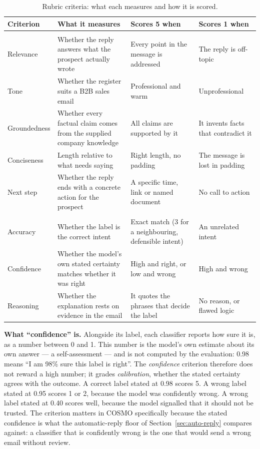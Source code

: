 \documentclass[a4paper]{article}
\begin{document}
\begin{table}[H]
\centering
\caption{Rubric criteria: what each measures and how it is scored.}
\label{tab:metric-defs}
\small
\begin{tabularx}{\textwidth}{>{\raggedright\arraybackslash}p{2.1cm} >{\raggedright\arraybackslash}X >{\raggedright\arraybackslash}X >{\raggedright\arraybackslash}X}
\toprule
\textbf{Criterion} & \textbf{What it measures} & \textbf{Scores 5 when} & \textbf{Scores 1 when} \\
\midrule
\multicolumn{4}{l}{\emph{Task 1 --- reply generation}} \\
Relevance & Whether the reply answers what the prospect actually wrote & Every point in the message is addressed & The reply is off-topic \\
Tone & Whether the register suits a B2B sales email & Professional and warm & Unprofessional \\
Groundedness & Whether every factual claim comes from the supplied company knowledge & All claims are supported by it & It invents facts that contradict it \\
Conciseness & Length relative to what needs saying & Right length, no padding & The message is lost in padding \\
Next step & Whether the reply ends with a concrete action for the prospect & A specific time, link or named document & No call to action \\
\midrule
\multicolumn{4}{l}{\emph{Task 2 --- intent classification}} \\
Accuracy & Whether the label is the correct intent & Exact match (3 for a neighbouring, defensible intent) & An unrelated intent \\
Confidence & Whether the model's own stated certainty matches whether it was right & High and right, or low and wrong & High and wrong \\
Reasoning & Whether the explanation rests on evidence in the email & It quotes the phrases that decide the label & No reason, or flawed logic \\
\bottomrule
\end{tabularx}
\end{table}

\textbf{What ``confidence'' is.} Alongside its label, each classifier reports
how sure it is, as a number between 0 and 1. This number is the model's own
estimate about its own answer --- a self-assessment --- and is not computed by
the evaluation: 0.98 means ``I am 98\% sure this label is right''. The
\emph{confidence} criterion therefore does not reward a high number; it grades
\emph{calibration}, whether the stated certainty agrees with the outcome. A
correct label stated at 0.98 scores 5. A wrong label stated at 0.95 scores 1 or
2, because the model was confidently wrong. A wrong label stated at 0.40 scores
well, because the model signalled that it should not be trusted. The criterion
matters in COSMO specifically because the stated confidence is what the
automatic-reply floor of Section~\ref{sec:auto-reply} compares against: a
classifier that is confidently wrong is the one that would send a wrong email
without review.
\end{document}
